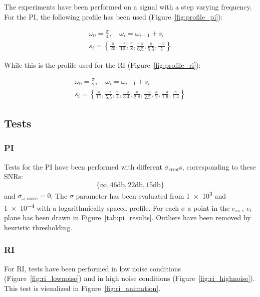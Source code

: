 \documentclass{article}
\begin{document}
The experiments have been performed on a signal with a step varying frequency. For the PI, the following profile has been used (Figure~\ref{fig:profile_pi}):

\begin{equation*}
\begin{gathered}
\omega_0 = \frac{\pi}{4}, \quad \omega_i = \omega_{i-1} + s_i\\
s_i = \left\{
\frac{\pi}{20}, 
\frac{-\pi}{10},
\frac{\pi}{8},
\frac{-\pi}{6.5},
\frac{\pi}{5.5},
\frac{-\pi}{5}
\right\}
\end{gathered}
\end{equation*}

While this is the profile used for the RI (Figure~\ref{fig:profile_ri}):

\begin{equation*}
\begin{gathered}
\omega_0 = \frac{\pi}{2}, \quad \omega_i = \omega_{i-1} + s_i\\
s_i = \left\{
\frac{\pi}{11}, 
\frac{-\pi}{5.5},
\frac{\pi}{4},
\frac{-\pi}{3.4},
\frac{\pi}{2.8},
\frac{-\pi}{2.5},
\frac{\pi}{2},
\frac{-\pi}{1.6},
\frac{\pi}{1.4}
\right\}
\end{gathered}
\end{equation*}

\subsection{Tests}
\subsubsection{PI}
Tests for the PI have been performed with different $\sigma_{\text{error}}$s, corresponding to these SNRs: $$\big\{ \infty, 46 \si{\decibel}, 22 \si{\decibel}, 15 \si{\decibel} \big\}$$ and $\sigma_{\omega,\text{noise}}=0$.
The $\sigma$ parameter has been evaluated from \num{1e+3} and \num{1e-4} with a logarithmically spaced profile. For each $\sigma$ a point in the $e_{ss}\ ,\ {e_t}$ plane has been drawn in Figure~\ref{tab:pi_results}. Outliers have been removed by heuristic thresholding.

\subsubsection{RI}
For RI, tests have been performed in low noise conditions (Figure~\ref{fig:ri_lownoise}) and in high noise conditions (Figure~\ref{fig:ri_highnoise}). This test is visualized in Figure~\ref{fig:ri_animation}.  
\end{document}
